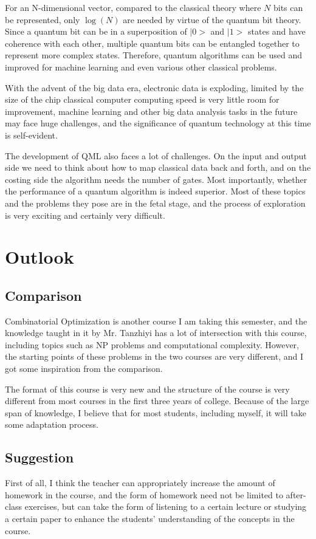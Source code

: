 \documentclass[11pt]{article}
\begin{document}
For an N-dimensional vector, compared to the classical theory where $N$ bits can be represented, only $\log(N)$ are needed by virtue of the quantum bit theory. Since a quantum bit can be in a superposition of $|0>$ and $|1>$ states and have coherence with each other, multiple quantum bits can be entangled together to represent more complex states. Therefore, quantum algorithms can be used and improved for machine learning and even various other classical problems.

With the advent of the big data era, electronic data is exploding, limited by the size of the chip classical computer computing speed is very little room for improvement, machine learning and other big data analysis tasks in the future may face huge challenges, and the significance of quantum technology at this time is self-evident.

The development of QML also faces a lot of challenges. On the input and output side we need to think about how to map classical data back and forth, and on the costing side the algorithm needs the number of gates. Most importantly, whether the performance of a quantum algorithm is indeed superior. Most of these topics and the problems they pose are in the fetal stage, and the process of exploration is very exciting and certainly very difficult.
\section{Outlook}
\subsection{Comparison}
\qquad Combinatorial Optimization is another course I am taking this semester, and the knowledge taught in it by Mr. Tanzhiyi has a lot of intersection with this course, including topics such as NP problems and computational complexity. However, the starting points of these problems in the two courses are very different, and I got some inspiration from the comparison.

The format of this course is very new and the structure of the course is very different from most courses in the first three years of college. Because of the large span of knowledge, I believe that for most students, including myself, it will take some adaptation process.
\subsection{Suggestion}
\qquad First of all, I think the teacher can appropriately increase the amount of homework in the course, and the form of homework need not be limited to after-class exercises, but can take the form of listening to a certain lecture or studying a certain paper to enhance the students' understanding of the concepts in the course. 
\end{document}
